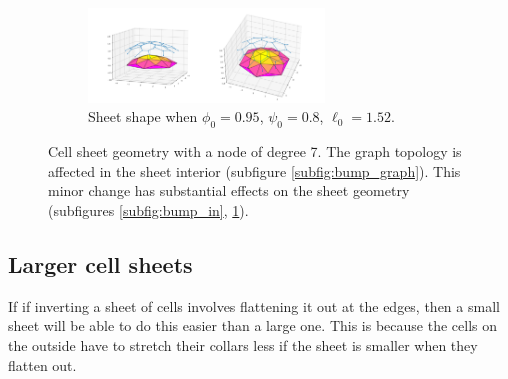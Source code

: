\documentclass[draft]{article}
\begin{document}
\begin{figure}[htbp]
\begin{subfigure}[b]{\textwidth}
        \includegraphics[width=0.69\textwidth]{figures/numerical/bump/bump0.95_0.8_1.52_10_plot.png}
        \caption{Sheet shape when $\phi_0=0.95$, $\psi_0=0.8$, $\ell_0=1.52$.}
        \label{subfig:bump_out}
    \end{subfigure}
    \caption{Cell sheet geometry with a node of degree 7. The graph topology is affected in the sheet interior (subfigure \ref{subfig:bump_graph}). This minor change has substantial effects on the sheet geometry (subfigures \ref{subfig:bump_in}, \ref{subfig:bump_out}).}
    \label{fig:bump}
\end{figure}

\subsection{Larger cell sheets}

If if inverting a sheet of cells involves flattening it out at the edges, then a small sheet will be able to do this easier than a large one. This is because the cells on the outside have to stretch their collars less if the sheet is smaller when they flatten out. 
\end{document}
